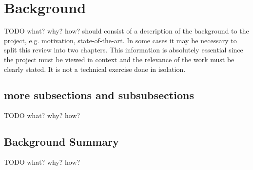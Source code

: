 
\chapter{Background}

TODO what? why? how?
should consist of a description of the background to the project, e.g. motivation, state-of-the-art.
In some cases it may be necessary to split this review into two chapters.
This information is absolutely essential since the project must be viewed in context and the relevance of the work must be clearly stated.
It is not a technical exercise done in isolation.

\section{more subsections and subsubsections}

TODO what? why? how?

\section{Background Summary}

TODO what? why? how?




